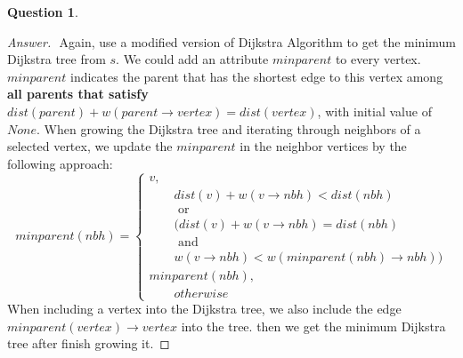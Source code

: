\documentclass{article}
\theoremstyle{plain}
\newtheorem{question}{Question}
\newenvironment{answer}[1][Answer]
    {\begin{proof}[#1]{$ $}\renewcommand\qedsymbol{$\vartriangle$}}
    {\end{proof}}
\begin{document}
\begin{question}
\end{question}
\begin{answer}
    Again, use a modified version of Dijkstra Algorithm to get the minimum Dijkstra tree from $s$. We could add an attribute $minparent$ to every vertex. $minparent$ indicates the parent that has the shortest edge to this vertex among \textbf{all parents that satisfy $dist(parent) + w(parent \rightarrow vertex) = dist(vertex)$}, with initial value of $None$. When growing the Dijkstra tree and iterating through neighbors of a selected vertex, we update the $minparent$ in the neighbor vertices by the following approach:
    \begin{equation*}
        minparent(nbh) =
        \begin{cases}
            v, \\
            \quad \quad dist(v) + w(v \rightarrow nbh) < dist(nbh)\\
            \quad \quad \text{ or }\\
            \quad \quad (dist(v) + w(v \rightarrow nbh) = dist(nbh) \\
            \quad \quad \text{ and }\\
            \quad \quad w(v \rightarrow nbh) < w(minparent(nbh) \rightarrow nbh))\\
            minparent(nbh), \\
            \quad \quad otherwise
        \end{cases}
    \end{equation*}
    When including a vertex into the Dijkstra tree, we also include the edge\\ $minparent(vertex) \rightarrow vertex$ into the tree. then we get the minimum Dijkstra tree after finish growing it.
\end{answer}
\end{document}
